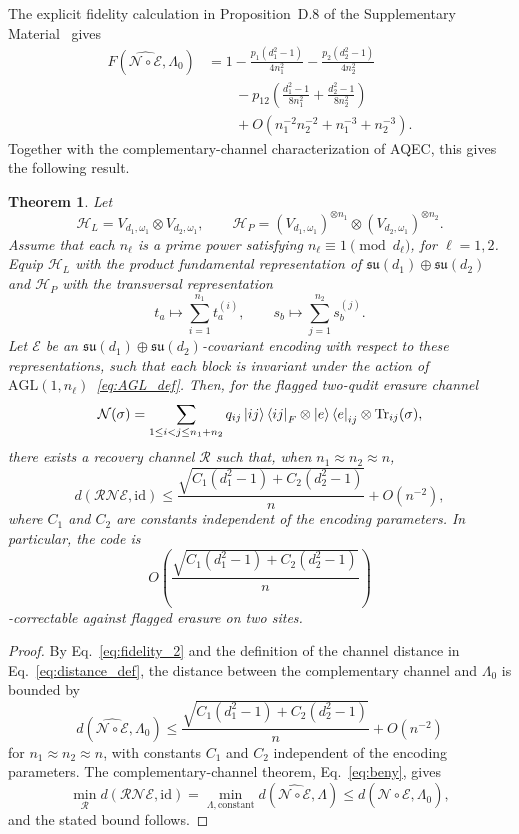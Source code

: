 \documentclass[10pt,twocolumn,superscriptaddress,aps,amsmath,amssymb,citeautoscript,floatfix,prx]{revtex4-2}
\newtheorem{theorem}{Theorem}
\theoremstyle{plain}
\theoremstyle{plain}
\theoremstyle{plain}
\theoremstyle{plain}
\theoremstyle{plain}
\theoremstyle{plain}
\begin{document}
The explicit fidelity calculation in Proposition~D.8 of the Supplementary Material~\cite{SuppMat} gives
\begin{equation}\label{eq:fidelity_2}
\begin{aligned}
F\left(\widehat{\mathcal N\circ\mathcal E},\Lambda_0\right)
&=
1
-
\frac{p_1(d_1^2-1)}{4n_1^2}
-
\frac{p_2(d_2^2-1)}{4n_2^2}
\\
&\qquad
-
p_{12}
\left(
\frac{d_1^2-1}{8n_1^2}
+
\frac{d_2^2-1}{8n_2^2}
\right)
\\
&\qquad
+
O\left(n_1^{-2}n_2^{-2}+n_1^{-3}+n_2^{-3}\right).
\end{aligned}
\end{equation}
Together with the complementary-channel characterization of AQEC, this gives the following result.

\begin{theorem}
Let
$$
\mathcal H_L
=
V_{d_1,\omega_1}
\otimes
V_{d_2,\omega_1},
\qquad
\mathcal H_P
=
(V_{d_1,\omega_1})^{\otimes n_1}
\otimes
(V_{d_2,\omega_1})^{\otimes n_2}.
$$
Assume that each $n_\ell$ is a prime power satisfying $n_\ell\equiv 1\pmod{d_\ell}$, for $\ell=1,2$. Equip $\mathcal H_L$ with the product fundamental representation of $\mathfrak{su}(d_1)\oplus\mathfrak{su}(d_2)$ and $\mathcal H_P$ with the transversal representation
$$
t_a
\longmapsto
\sum_{i=1}^{n_1} t_a^{(i)},
\qquad
s_b
\longmapsto
\sum_{j=1}^{n_2} s_b^{(j)} .
$$
Let $\mathcal E$ be an $\mathfrak{su}(d_1)\oplus\mathfrak{su}(d_2)$-covariant encoding with respect to these representations, such that each block is invariant under the action of $\mathrm{AGL}(1,n_\ell)$~\eqref{eq:AGL_def}. Then, for the flagged two-qudit erasure channel
$$
\mathcal N(\sigma)
=
\sum_{1\le i<j\le n_1+n_2}
q_{ij}
\ket{ij}\bra{ij}_F
\otimes
\ket e\bra e_{ij}
\otimes
\operatorname{Tr}_{ij}(\sigma),
$$
there exists a recovery channel $\mathcal R$ such that, when $n_1\approx n_2\approx n$,
$$
d(\mathcal R\mathcal N\mathcal E,\mathrm{id})
\le
\frac{
\sqrt{
C_1(d_1^2-1)
+
C_2(d_2^2-1)
}
}{n}
+
O(n^{-2}),
$$
where $C_1$ and $C_2$ are constants independent of the encoding parameters. In particular, the code is
$$
O\left(
\frac{
\sqrt{
C_1(d_1^2-1)
+
C_2(d_2^2-1)
}
}{n}
\right)
$$
-correctable against flagged erasure on two sites.
\end{theorem}

\begin{proof}
By Eq.~\eqref{eq:fidelity_2} and the definition of the channel distance in Eq.~\eqref{eq:distance_def}, the distance between the complementary channel and $\Lambda_0$ is bounded by
$$
d\left(\widehat{\mathcal N\circ\mathcal E},\Lambda_0\right)
\le
\frac{
\sqrt{
C_1(d_1^2-1)
+
C_2(d_2^2-1)
}
}{n}
+
O(n^{-2})
$$
for $n_1\approx n_2\approx n$, with constants $C_1$ and $C_2$ independent of the encoding parameters. The complementary-channel theorem, Eq.~\eqref{eq:beny}, gives
$$
\min_{\mathcal R}
d(\mathcal R\mathcal N\mathcal E,\mathrm{id})
=
\min_{\Lambda,\mathrm{constant}}
d\left(\widehat{\mathcal N\circ\mathcal E},\Lambda\right)
\le
d\left(\widehat{\mathcal N\circ\mathcal E},\Lambda_0\right),
$$
and the stated bound follows.
\end{proof}
\end{document}
